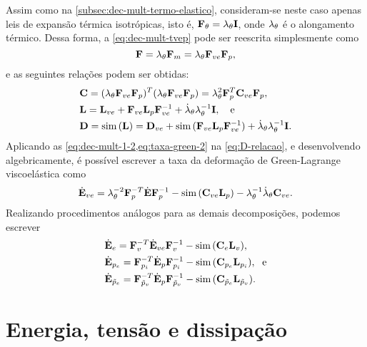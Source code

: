 \documentclass[Tese.tex]{subfiles}
\begin{document}
Assim como na \autoref{subsec:dec-mult-termo-elastico}, consideram-se neste caso apenas leis de expansão térmica isotrópicas, isto é, $\mathbf{F}_{\theta} = \lambda_{\theta}\mathbf{I}$, onde $\lambda_{\theta}$ é o alongamento térmico. Dessa forma, a \cref{eq:dec-mult-tvep} pode ser reescrita simplesmente como
\begin{equation}
\mathbf{F} = \lambda_{\theta}\mathbf{F}_m = \lambda_{\theta}\mathbf{F}_{ve}\mathbf{F}_p, \label{eq:dec-mult-1-2}
\end{equation}
e as seguintes relações podem ser obtidas:
\begin{align}
&\mathbf{C} = (\lambda_{\theta}\mathbf{F}_{ve}\mathbf{F}_p)^T(\lambda_{\theta}\mathbf{F}_{ve}\mathbf{F}_p) = \lambda_{\theta}^2\mathbf{F}_p^T\mathbf{C}_{ve}\mathbf{F}_p,\\
&\mathbf{L} = \mathbf{L}_{ve} + \mathbf{F}_{ve}\mathbf{L}_p\mathbf{F}_{ve}^{-1} + \dot{\lambda}_{\theta}\lambda_{\theta}^{-1}\mathbf{I}, \text{\quad e}\\
&\mathbf{D} = \text{sim}\,(\mathbf{L}) = \mathbf{D}_{ve} + \text{sim}\,(\mathbf{F}_{ve}\mathbf{L}_p\mathbf{F}_{ve}^{-1}) + \dot{\lambda}_{\theta}\lambda_{\theta}^{-1}\mathbf{I}. \label{eq:D-relacao}
\end{align}
Aplicando as \cref{eq:dec-mult-1-2,eq:taxa-green-2} na \cref{eq:D-relacao}, e desenvolvendo algebricamente, é possível escrever a taxa da deformação de Green-Lagrange viscoelástica como
\begin{equation}
\dot{\mathbf{E}}_{ve} = \lambda_{\theta}^{-2}\mathbf{F}_p^{-T}\dot{\mathbf{E}}\mathbf{F}_p^{-1} - \text{sim}\,(\mathbf{C}_{ve}\mathbf{L}_p) - \lambda_{\theta}^{-1}\dot{\lambda}_{\theta}\mathbf{C}_{ve}. \label{eq:dotEve}
\end{equation}
Realizando procedimentos análogos para as demais decomposições, podemos escrever
\begin{align}
&\dot{\mathbf{E}}_e = \mathbf{F}_v^{-T}\dot{\mathbf{E}}_{ve}\mathbf{F}_v^{-1} - \text{sim}\,(\mathbf{C}_e\mathbf{L}_v),\label{eq:dotEe} \\
&\dot{\mathbf{E}}_{p_e} = \mathbf{F}_{p_i}^{-T}\dot{\mathbf{E}}_p\mathbf{F}_{p_i}^{-1} - \text{sim}\,(\mathbf{C}_{p_e}\mathbf{L}_{p_i}) , \text{\; e} \label{eq:dotEpe} \\
&\dot{\mathbf{E}}_{\tilde{p}_e} = \mathbf{F}_{\tilde{p}_v}^{-T}\dot{\mathbf{E}}_p\mathbf{F}_{\tilde{p}_v}^{-1} - \text{sim}\,(\mathbf{C}_{\tilde{p}_e}\mathbf{L}_{\tilde{p}_v}). \label{eq:dotEpve}
\end{align}

\section{Energia, tensão e dissipação}
\end{document}
